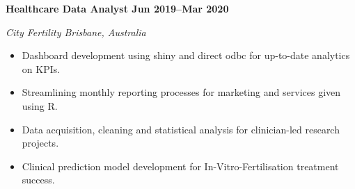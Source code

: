 \textbf{Healthcare Data Analyst \hfill Jun 2019--Mar 2020}\par
\textit{City Fertility \hfill Brisbane, Australia}\par
\begin{itemize}
	\item Dashboard development using shiny and direct odbc for up-to-date analytics on KPIs.
	\item Streamlining monthly reporting processes for marketing and services given using R.
    \item Data acquisition, cleaning and statistical analysis for clinician-led research projects.
    \item Clinical prediction model development for In-Vitro-Fertilisation treatment success.
\end{itemize}\par